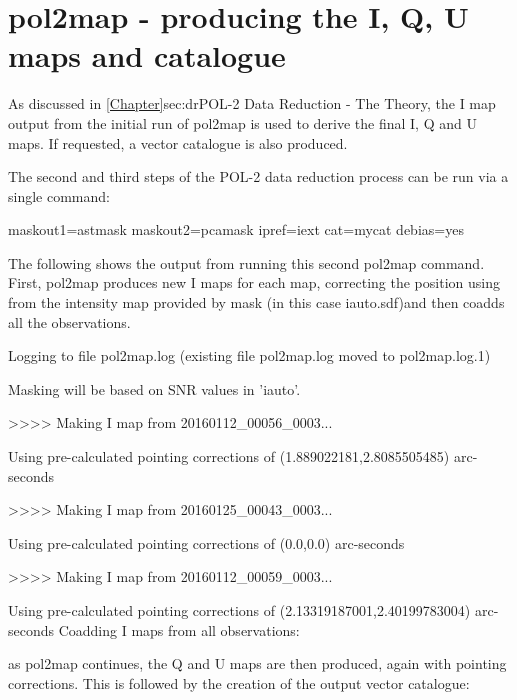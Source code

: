 \section{pol2map - producing the I, Q, U maps and catalogue}


As discussed in \cref{Chapter}{sec:dr}{POL-2 Data Reduction - The Theory}, the I map output from the initial run of pol2map
is used to derive the final I, Q and U maps. If requested, a vector catalogue is also produced.

The second and third steps of the POL-2 data reduction process can be run via a single command:

\begin{terminalv}
          maskout1=astmask maskout2=pcamask ipref=iext cat=mycat debias=yes
\end{terminalv}

The following shows the output from running this second pol2map command. First, pol2map produces
new I maps for each map, correcting the position using from the intensity map provided by mask 
(in this case iauto.sdf)and then coadds all the observations.

\begin{terminalv}
Logging to file pol2map.log
(existing file pol2map.log moved to pol2map.log.1)

Masking will be based on SNR values in 'iauto'.

>>>>   Making I map from 20160112_00056_0003...

   Using pre-calculated pointing corrections of (1.889022181,2.8085505485) arc-seconds

>>>>   Making I map from 20160125_00043_0003...

   Using pre-calculated pointing corrections of (0.0,0.0) arc-seconds

>>>>   Making I map from 20160112_00059_0003...

   Using pre-calculated pointing corrections of (2.13319187001,2.40199783004) arc-seconds
Coadding I maps from all observations:
\end{terminalv}

as pol2map continues, the Q and U maps are then produced, again with pointing corrections. This is followed by the creation of
the output vector catalogue:

